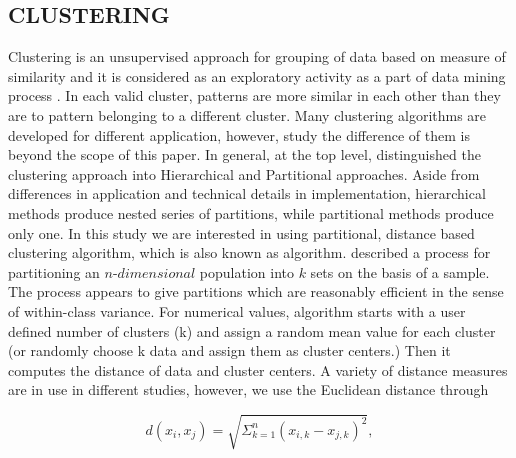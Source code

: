 \subsection{CLUSTERING} \label{clustering}
Clustering is an unsupervised approach for grouping of data based on measure of similarity and it is considered as an exploratory activity as a part of data mining process \citep{Fayyad_1996_IEEE}. In each valid cluster, patterns are more similar in each other than they are to pattern belonging to a different cluster. Many clustering algorithms are developed for different application, however, study the difference of them is beyond the scope of this paper. In general, at the top level,  \citet{Jain_1999} distinguished the clustering approach into Hierarchical and Partitional approaches. Aside from differences in application and technical details in implementation, hierarchical methods produce nested series of partitions, while partitional methods produce only one. In this study we are interested in using partitional, distance based clustering algorithm, which is also known as \kmeans{} algorithm.  \citet{Macqueen_1967_Proc}  described a process for partitioning an $n$-$dimensional$ population into $k$ sets on the basis of a sample. The process appears to give partitions which are reasonably efficient in the sense of within-class variance. For numerical values, \kmeans{} algorithm starts with a user defined number of clusters (k) and assign a random mean value for each cluster (or randomly choose k data and assign them as cluster centers.) Then it computes the distance of data and cluster centers. A variety of distance measures are in use in different studies, however, we use the Euclidean distance through 

\begin{equation}
d(x_i,x_j)=\sqrt{\Sigma_{k=1}^{n}(x_{i,k} - x_{j,k})^2},
\end{equation}

